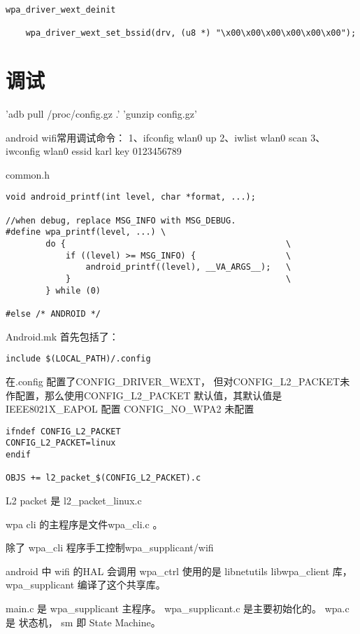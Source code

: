 \documentclass[a4paper,11pt,]{article}%
\begin{document}
\begin{lstlisting}
wpa_driver_wext_deinit

	wpa_driver_wext_set_bssid(drv, (u8 *) "\x00\x00\x00\x00\x00\x00");
\end{lstlisting}


\section{调试}
'adb pull /proc/config.gz .'
'gunzip config.gz'

android wifi常用调试命令：
1、ifconfig wlan0 up
2、iwlist wlan0 scan
3、iwconfig wlan0 essid karl key 0123456789

common.h

\begin{lstlisting}
void android_printf(int level, char *format, ...);

//when debug, replace MSG_INFO with MSG_DEBUG.
#define wpa_printf(level, ...) \
        do {                                            \
            if ((level) >= MSG_INFO) {                  \
                android_printf((level), __VA_ARGS__);   \
            }                                           \
        } while (0)

#else /* ANDROID */
\end{lstlisting}


Android.mk 首先包括了：
\begin{lstlisting}
include $(LOCAL_PATH)/.config
\end{lstlisting}

在.config 配置了CONFIG_DRIVER_WEXT，
但对CONFIG_L2_PACKET未作配置，那么使用CONFIG_L2_PACKET 默认值，其默认值是
IEEE8021X_EAPOL 配置
CONFIG_NO_WPA2 未配置



\begin{lstlisting}
ifndef CONFIG_L2_PACKET
CONFIG_L2_PACKET=linux
endif

OBJS += l2_packet_$(CONFIG_L2_PACKET).c

\end{lstlisting}
L2 packet 是 l2_packet_linux.c

wpa cli 的主程序是文件wpa_cli.c 。


除了 wpa_cli 程序手工控制wpa_supplicant/wifi 

android 中 wifi 的HAL 会调用 wpa_ctrl 使用的是 libnetutils
libwpa_client 库， wpa_supplicant 编译了这个共享库。

main.c 是 wpa_supplicant 主程序。
wpa_supplicant.c 是主要初始化的。
wpa.c 是 状态机， sm 即 State Machine。
\end{document}
